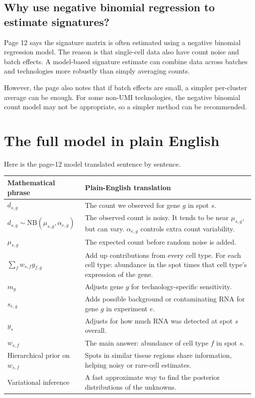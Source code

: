 \documentclass[11pt]{article}
\newcommand{\NB}{\mathrm{NB}}
\begin{document}
\subsection{Why use negative binomial regression to estimate signatures?}

Page 12 says the signature matrix is often estimated using a negative binomial regression model. The reason is that single-cell data also have count noise and batch effects. A model-based signature estimate can combine data across batches and technologies more robustly than simply averaging counts.

However, the page also notes that if batch effects are small, a simpler per-cluster average can be enough. For some non-UMI technologies, the negative binomial count model may not be appropriate, so a simpler method can be recommended.

\section{The full model in plain English}

Here is the page-12 model translated sentence by sentence.

\begin{longtable}{p{}p{}}
\toprule
Mathematical phrase & Plain-English translation \\
\midrule
$d_{s,g}$ & The count we observed for gene $g$ in spot $s$. \\
$d_{s,g}\sim \NB(\mu_{s,g},\alpha_{e,g})$ & The observed count is noisy. It tends to be near $\mu_{s,g}$, but can vary. $\alpha_{e,g}$ controls extra count variability. \\
$\mu_{s,g}$ & The expected count before random noise is added. \\
$\sum_f w_{s,f}g_{f,g}$ & Add up contributions from every cell type. For each cell type: abundance in the spot times that cell type's expression of the gene. \\
$m_g$ & Adjusts gene $g$ for technology-specific sensitivity. \\
$s_{e,g}$ & Adds possible background or contaminating RNA for gene $g$ in experiment $e$. \\
$y_s$ & Adjusts for how much RNA was detected at spot $s$ overall. \\
$w_{s,f}$ & The main answer: abundance of cell type $f$ in spot $s$. \\
Hierarchical prior on $w_{s,f}$ & Spots in similar tissue regions share information, helping noisy or rare-cell estimates. \\
Variational inference & A fast approximate way to find the posterior distributions of the unknowns. \\
\bottomrule
\end{longtable}
\end{document}
